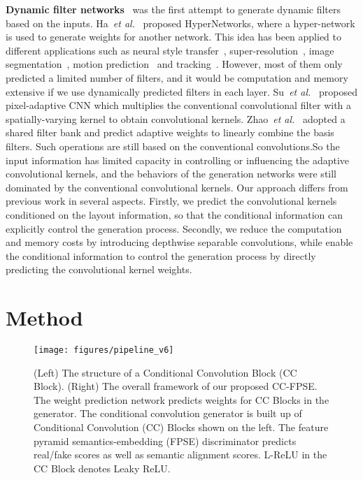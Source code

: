 \documentclass{article}
\newcommand{\etal}{\textit{et al.}}
\begin{document}
\noindent\textbf{Dynamic filter networks}~\cite{jia2016dynamic} was the first attempt to generate dynamic filters based on the inputs.
Ha~\etal~\cite{ha2016hypernetworks} proposed HyperNetworks, where a hyper-network is used to generate weights for another network.
This idea has been applied to different applications such as neural style transfer~\cite{shen2018neural}, super-resolution~\cite{jo2018deep,hu2019meta}, image segmentation~\cite{harley2017segmentation,wu2018dynamic}, motion prediction~\cite{xue2016visual} and tracking~\cite{li2017tracking}.
However, most of them only predicted a limited number of filters, and it would be computation and memory extensive if we use dynamically predicted filters in each layer.
Su~\etal~\cite{su2019pixel} proposed pixel-adaptive CNN which multiplies the conventional convolutional filter with a spatially-varying kernel to obtain convolutional kernels.
Zhao~\etal~\cite{zhao2018dynamic} adopted a shared filter bank and predict adaptive weights to linearly combine the basis filters.
Such operations are still based on the conventional convolutions.So the input information has limited capacity in controlling or influencing the adaptive convolutional kernels, and the behaviors of the generation networks were still dominated by the conventional convolutional kernels.
Our approach differs from previous work in several aspects.
Firstly, we predict the convolutional kernels conditioned on the layout information, so that the conditional information can explicitly control the generation process.
Secondly, we reduce the computation and memory costs by introducing depthwise separable convolutions, while enable the conditional information to control the generation process by directly predicting the convolutional kernel weights.

\section{Method}
\begin{figure}[t]
\centering
\texttt{[image: figures/pipeline\_v6]}
\caption{(Left) The structure of a Conditional Convolution Block (CC Block). (Right) The overall framework of our proposed CC-FPSE. The weight prediction network predicts weights for CC Blocks in the generator. The conditional convolution generator is built up of Conditional Convolution (CC) Blocks shown on the left. The feature pyramid semantics-embedding (FPSE) discriminator predicts real/fake scores as well as semantic alignment scores. L-ReLU in the CC Block denotes Leaky ReLU.}
\label{fig:pipeline}
\end{figure}
\end{document}
